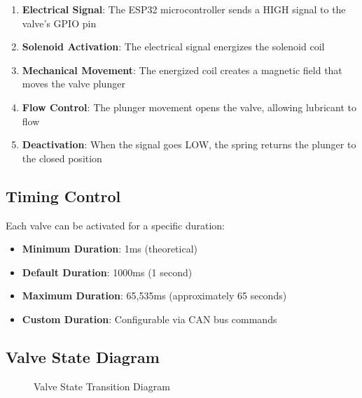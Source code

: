 \documentclass[11pt,a4paper]{article}
\begin{document}
\begin{enumerate}
    \item \textbf{Electrical Signal}: The ESP32 microcontroller sends a HIGH signal to the valve's GPIO pin
    \item \textbf{Solenoid Activation}: The electrical signal energizes the solenoid coil
    \item \textbf{Mechanical Movement}: The energized coil creates a magnetic field that moves the valve plunger
    \item \textbf{Flow Control}: The plunger movement opens the valve, allowing lubricant to flow
    \item \textbf{Deactivation}: When the signal goes LOW, the spring returns the plunger to the closed position
\end{enumerate}

\subsection{Timing Control}
Each valve can be activated for a specific duration:
\begin{itemize}
    \item \textbf{Minimum Duration}: 1ms (theoretical)
    \item \textbf{Default Duration}: 1000ms (1 second)
    \item \textbf{Maximum Duration}: 65,535ms (approximately 65 seconds)
    \item \textbf{Custom Duration}: Configurable via CAN bus commands
\end{itemize}

\subsection{Valve State Diagram}

\begin{figure}[H]
\centering
{}
\caption{Valve State Transition Diagram}
\label{fig:valve_states}
\end{figure}
\end{document}

